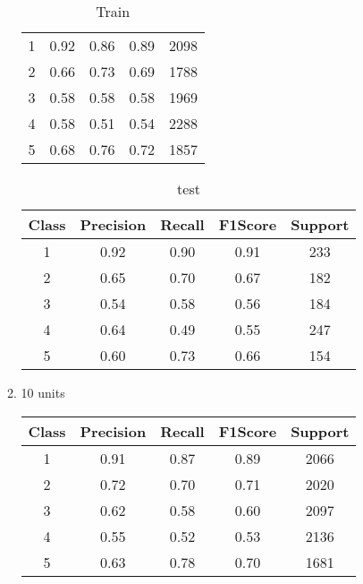 \begin{enumerate}[label=(\alph*)]
\begin{enumerate}[label=\roman*.]
\begin{table}[!htb]
\begin{tabular}{ccccc}
            1     & 0.92      & 0.86   & 0.89    & 2098    \\
            2     & 0.66      & 0.73   & 0.69    & 1788    \\
            3     & 0.58      & 0.58   & 0.58    & 1969    \\
            4     & 0.58      & 0.51   & 0.54    & 2288    \\
            5     & 0.68      & 0.76   & 0.72    & 1857    \\ \hline
            \end{tabular}
            \caption{Train}
            \label{part b train depth 5}
        \end{table}
        \begin{table}[!htb]
            \centering
            \begin{tabular}{ccccc}
            \hline
            Class & Precision & Recall & F1Score & Support \\ \hline
            1     & 0.92      & 0.90   & 0.91    & 233     \\
            2     & 0.65      & 0.70   & 0.67    & 182     \\
            3     & 0.54      & 0.58   & 0.56    & 184     \\
            4     & 0.64      & 0.49   & 0.55    & 247     \\
            5     & 0.60      & 0.73   & 0.66    & 154     \\ \hline
            \end{tabular}
            \caption{test}
            \label{part b test depth 5}
        \end{table}
        \newpage
        \item 10 units
        \begin{table}[!htb]
            \centering
            \begin{tabular}{ccccc}
            \hline
            Class & Precision & Recall & F1Score & Support \\ \hline
            1     & 0.91      & 0.87   & 0.89    & 2066    \\
            2     & 0.72      & 0.70   & 0.71    & 2020    \\
            3     & 0.62      & 0.58   & 0.60    & 2097    \\
            4     & 0.55      & 0.52   & 0.53    & 2136    \\
            5     & 0.63      & 0.78   & 0.70    & 1681    \\ \hline

\end{tabular}
\end{table}
\end{enumerate}
\end{enumerate}
